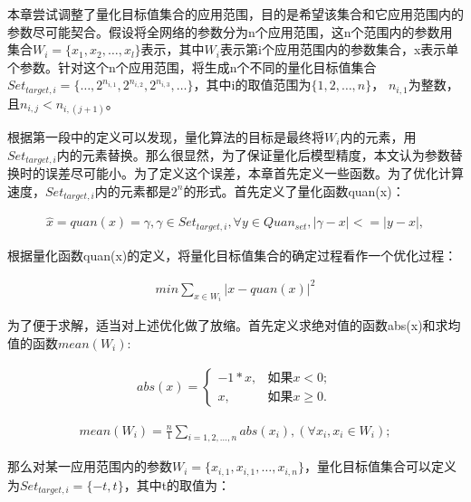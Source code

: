 \documentclass[ pdftex, oneside, master]{NJUthesis}
\begin{document}
本章尝试调整了量化目标值集合的应用范围，目的是希望该集合和它应用范围内的参数尽可能契合。假设将全网络的参数分为n个应用范围，这n个范围内的参数用集合$W_i = \{x_1, x_2, \dots, x_l\}$表示，其中$W_i$表示第i个应用范围内的参数集合，x表示单个参数。针对这个n个应用范围，将生成n个不同的量化目标值集合$Set_ {target,i} = \{\dots, 2^{n_{i,1}}, 2^{n_{i,2}}, 2^{n_{i,3}}, \dots\}$，其中i的取值范围为$\{1, 2, \dots, n\}$， $n_{i,1}$为整数，且$n_{i,j}<n_{i,(j+1)}$。

根据第一段中的定义可以发现，量化算法的目标是最终将$W_i$内的元素，用$Set_ {target,i}$内的元素替换。那么很显然，为了保证量化后模型精度，本文认为参数替换时的误差尽可能小。为了定义这个误差，本章首先定义一些函数。为了优化计算速度，$Set_ {target,i}$内的元素都是$2^n$的形式。首先定义了量化函数quan(x)：





\begin{eqnarray}
\hat x = quan(x) = \gamma,
\gamma \in Set_{target,i},
\forall y \in Quan_{set}, |\gamma - x|<= |y - x|,
\label{quan}
\end{eqnarray}

根据量化函数quan(x)的定义，将量化目标值集合的确定过程看作一个优化过程：

\begin{eqnarray}
min \sum_{x \in W_i}|x-quan(x)|^2
\end{eqnarray}

为了便于求解，适当对上述优化做了放缩。首先定义求绝对值的函数abs(x)和求均值的函数$mean(W_i)$:

\begin{eqnarray}
abs(x) = \begin{cases}
		-1*x,& \text{如果} x < 0; \\
		x,& \text{如果} x \geq 0.
		\end{cases}
\end{eqnarray}

\begin{eqnarray}
mean(W_i) = \frac{n}{1}\sum_{i=1,2,\dots,n}abs(x_i) ,( \forall x_i, x_i \in W_i );
\end{eqnarray}

那么对某一应用范围内的参数$W_i = \{x_{i,1}, x_{i,1}, \dots, x_{i,n}\}$，量化目标值集合可以定义为$Set_ {target,i} = \{-t, t\}$，其中t的取值为：
\end{document}
